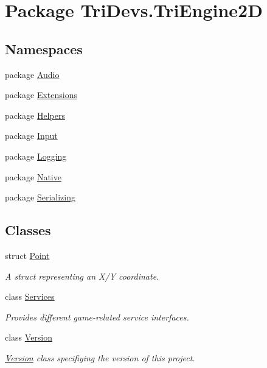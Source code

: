 \hypertarget{namespace_tri_devs_1_1_tri_engine2_d}{\section{Package Tri\-Devs.\-Tri\-Engine2\-D}
\label{namespace_tri_devs_1_1_tri_engine2_d}
}
\subsection*{Namespaces}
\begin{DoxyCompactItemize}
\item 
package \hyperlink{namespace_tri_devs_1_1_tri_engine2_d_1_1_audio}{Audio}
\item 
package \hyperlink{namespace_tri_devs_1_1_tri_engine2_d_1_1_extensions}{Extensions}
\item 
package \hyperlink{namespace_tri_devs_1_1_tri_engine2_d_1_1_helpers}{Helpers}
\item 
package \hyperlink{namespace_tri_devs_1_1_tri_engine2_d_1_1_input}{Input}
\item 
package \hyperlink{namespace_tri_devs_1_1_tri_engine2_d_1_1_logging}{Logging}
\item 
package \hyperlink{namespace_tri_devs_1_1_tri_engine2_d_1_1_native}{Native}
\item 
package \hyperlink{namespace_tri_devs_1_1_tri_engine2_d_1_1_serializing}{Serializing}
\end{DoxyCompactItemize}
\subsection*{Classes}
\begin{DoxyCompactItemize}
\item 
struct \hyperlink{struct_tri_devs_1_1_tri_engine2_d_1_1_point}{Point}
\begin{DoxyCompactList}\small\item\em A struct representing an X/\-Y coordinate. \end{DoxyCompactList}\item 
class \hyperlink{class_tri_devs_1_1_tri_engine2_d_1_1_services}{Services}
\begin{DoxyCompactList}\small\item\em Provides different game-\/related service interfaces. \end{DoxyCompactList}\item 
class \hyperlink{class_tri_devs_1_1_tri_engine2_d_1_1_version}{Version}
\begin{DoxyCompactList}\small\item\em \hyperlink{class_tri_devs_1_1_tri_engine2_d_1_1_version}{Version} class specifiying the version of this project. \end{DoxyCompactList}\end{DoxyCompactItemize}
